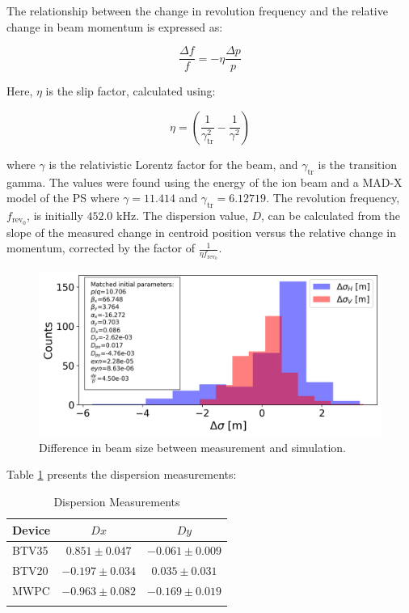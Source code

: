 \documentclass[a4paper,
               biblatex,     %
               ]{jacow}
\begin{document}
The relationship between the change in revolution frequency and the relative change in beam momentum is expressed as:

\begin{equation}
\frac{\Delta f}{f} = -\eta \frac{\Delta p}{p}
\end{equation}

Here, $\eta$ is the slip factor, calculated using:

\begin{equation}
\eta = \left(\frac{1}{\gamma_{\text{tr}}^{2}} - \frac{1}{\gamma^{2}}\right)
\end{equation}

where $\gamma$ is the relativistic Lorentz factor for the beam, and $\gamma_{\text{tr}}$ is the transition gamma. The values were found using the energy of the ion beam and a MAD-X model of the PS where $\gamma = 11.414$ and $\gamma_{\text{tr}} = 6.12719$. The revolution frequency, $f_{\text{rev}_0}$, is initially $452.0$ kHz. The dispersion value, $D$, can be calculated from the slope of the measured change in centroid position versus the relative change in momentum, corrected by the factor of $\frac{1}{\eta f_{\text{rev}_0}}$.

\begin{figure}[!htb]
   \centering
   \includegraphics*[width=1.0\columnwidth]{beam_size_diff.png}
   \caption{Difference in beam size between measurement and simulation.}
   \label{fig:diff_beam_size}
\end{figure}

Table \ref{tab:dispersion} presents the dispersion measurements:

\begin{table}[h!]
\centering
\caption{Dispersion Measurements}
\begin{tabular}{l c c}
\hline
Device & \(Dx\) & \(Dy\) \\
\hline
BTV35  & \(0.851 \pm 0.047\) & \(-0.061 \pm 0.009\) \\
BTV20  & \(-0.197 \pm 0.034\) & \(0.035 \pm 0.031\) \\
MWPC   & \(-0.963 \pm 0.082\) & \(-0.169 \pm 0.019\) \\
\hline
\label{tab:dispersion}
\end{tabular}
\end{table}
\end{document}
